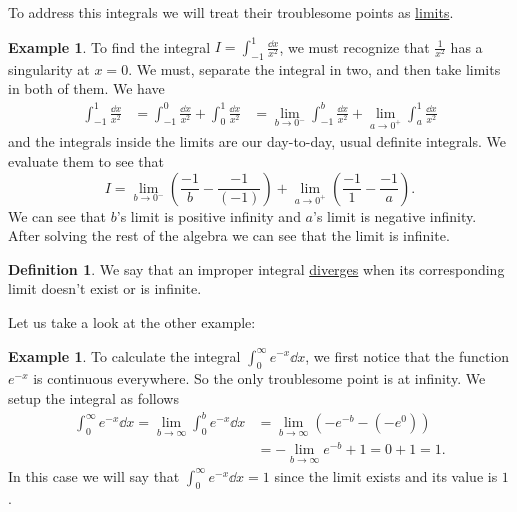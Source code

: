 \documentclass[12pt]{article}
\theoremstyle{plain}
\theoremstyle{definition}
\newtheorem*{Def}{Definition}       %
\newtheorem{Ex}[Th]{Example}           %
\theoremstyle{remark}
\renewcommand{\:}{\colon}           %
\newcommand{\un}[1]{\underline{#1}}
\renewcommand{\.}{\Cdot}                %
\begin{document}
\begin{multicols}{2}
\begin{center}
\end{center}
To address this integrals we will treat their troublesome points as \un{limits}.

\begin{Ex} 
To find the integral $I=\displaystyle\int_{-1}^{1}\frac{\dd x}{x^2}$, we must recognize that $\frac{1}{x^2}$ has a singularity at $x=0$. We must, separate the integral in two, and then take limits in both of them. We have 
\begin{align*}
  \int_{-1}^{1}\frac{\dd x}{x^2}&=\int_{-1}^{0}\frac{\dd x}{x^2}+\int_{0}^{1}\frac{\dd x}{x^2}
  &=\lim_{b\to 0^-}\int_{-1}^{b}\frac{\dd x}{x^2}+\lim_{a\to0^+}\int_{a}^{1}\frac{\dd x}{x^2}
\end{align*}
and the integrals inside the limits are our day-to-day, usual definite integrals. We evaluate them to see that 
$$I=\lim_{b\to0^-}\left(\frac{-1}{b}-\frac{-1}{(-1)}\right)+\lim_{a\to0^+}\left(\frac{-1}{1}-\frac{-1}{a}\right).$$
We can see that $b$'s limit is positive infinity and $a$'s limit is negative infinity. After solving the rest of the algebra we can see that the limit is infinite. 
\end{Ex}

\begin{Def}
We say that an improper integral \un{diverges} when its corresponding limit doesn't exist or is infinite.
\end{Def}

Let us take a look at the other example:

\begin{Ex}
  To calculate the integral $\displaystyle\int_0^{\infty}e^{-x}\dd x$, we first notice that the function $e^{-x}$ is continuous everywhere. So the only troublesome point is at infinity. We setup the integral as follows 
  \begin{align*}
    \int_0^{\infty}e^{-x}\dd x=\lim_{b\to\infty}\int_0^{b}e^{-x}\dd x&=\lim_{b\to\infty}(-e^{-b}-(-e^0))\\
    &=-\lim_{b\to\infty}e^{-b}+1=0+1=1.
  \end{align*}
  In this case we will say that $\displaystyle\int_0^{\infty}e^{-x}\dd x=1$ since the limit exists and its value is $1$.
\end{Ex}


\end{multicols}
\end{document}
